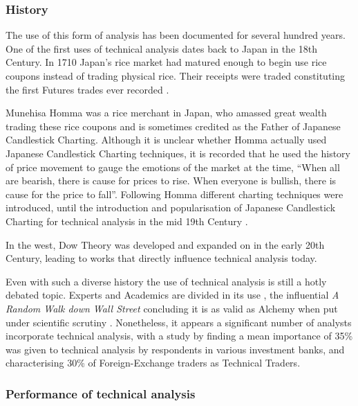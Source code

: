 \documentclass{article}
\theoremstyle{definition}
\begin{document}
\subsubsection{History}

The use of this form of analysis has been documented for several hundred years. One of the first uses of technical analysis dates back to Japan in the 18th Century. In 1710 Japan's rice market had matured enough to begin use rice coupons instead of trading physical rice. Their receipts were traded constituting the first Futures trades ever recorded \citep[p.15]{jcct1991}. 

Munehisa Homma was a rice merchant in Japan, who amassed great wealth trading these rice coupons and is sometimes credited as the Father of Japanese Candlestick Charting. Although it is unclear whether Homma actually used Japanese Candlestick Charting techniques, it is recorded that he used the history of price movement to gauge the emotions of the market at the time, ``When all are bearish, there is cause for prices to rise. When everyone is bullish, there is cause for the price to fall''. Following Homma different charting techniques were introduced, until the introduction and popularisation of Japanese Candlestick Charting for technical analysis in the mid 19th Century \citep[p.18]{jcct1994}.

In the west, Dow Theory was developed and expanded on in the early 20th Century, leading to works \citep{edwards2012technical} that directly influence technical analysis today.

Even with such a diverse history the use of technical analysis is still a hotly debated topic. Experts and Academics are divided in its use \citep{foundations}, the influential \textit{A Random Walk down Wall Street} concluding it is as valid as Alchemy when put under scientific scrutiny \cite[p.159]{randomwalk2012}. Nonetheless, it appears a significant number of analysts incorporate technical analysis, with a study by \cite{examininguse1997} finding a mean importance of 35\% was given to technical analysis by respondents in various investment banks, and \cite{cheung2000currency} characterising 30\% of Foreign-Exchange traders as Technical Traders. 

\subsubsection{Performance of technical analysis}
\end{document}

